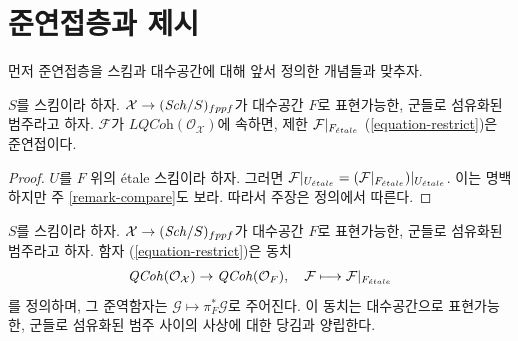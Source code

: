 \section{준연접층과 제시}
\label{section-quasi-coherent-presentation}

\noindent
먼저 준연접층을 스킴과 대수공간에 대해 앞서 정의한 개념들과 맞추자.

\begin{lemma}
\label{lemma-compare-locally-quasi-coherent}
$S$를 스킴이라 하자. $\mathcal{X} \to (\mathit{Sch}/S)_{fppf}$가
대수공간 $F$로 표현가능한, 군들로 섬유화된 범주라고 하자.
$\mathcal{F}$가 $\textit{LQCoh}(\mathcal{O}_\mathcal{X})$에 속하면,
제한 $\mathcal{F}|_{F_{\acute{e}tale}}$ (\ref{equation-restrict})은 준연접이다.
\end{lemma}

\begin{proof}
$U$를 $F$ 위의 \'etale 스킴이라 하자. 그러면
$\mathcal{F}|_{U_{\acute{e}tale}} = (\mathcal{F}|_{F_{\acute{e}tale}})|_{U_{\acute{e}tale}}$.
이는 명백하지만 주 \ref{remark-compare}도 보라.
따라서 주장은 정의에서 따른다.
\end{proof}

\begin{lemma}
\label{lemma-compare-quasi-coherent}
$S$를 스킴이라 하자. $\mathcal{X} \to (\mathit{Sch}/S)_{fppf}$가
대수공간 $F$로 표현가능한, 군들로 섬유화된 범주라고 하자.
함자 (\ref{equation-restrict})은 동치
$$
\mathit{QCoh}(\mathcal{O}_\mathcal{X}) \to \mathit{QCoh}(\mathcal{O}_F),\quad
\mathcal{F} \longmapsto \mathcal{F}|_{F_{\acute{e}tale}}
$$
를 정의하며, 그 준역함자는
$\mathcal{G} \mapsto \pi_F^*\mathcal{G}$로 주어진다.
이 동치는 대수공간으로 표현가능한, 군들로 섬유화된 범주 사이의
사상에 대한 당김과 양립한다.
\end{lemma}

